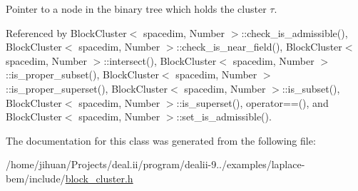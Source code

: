 Pointer to a node in the binary tree which holds the cluster $\tau$. 

Referenced by Block\+Cluster$<$ spacedim, Number $>$\+::check\+\_\+is\+\_\+admissible(), Block\+Cluster$<$ spacedim, Number $>$\+::check\+\_\+is\+\_\+near\+\_\+field(), Block\+Cluster$<$ spacedim, Number $>$\+::intersect(), Block\+Cluster$<$ spacedim, Number $>$\+::is\+\_\+proper\+\_\+subset(), Block\+Cluster$<$ spacedim, Number $>$\+::is\+\_\+proper\+\_\+superset(), Block\+Cluster$<$ spacedim, Number $>$\+::is\+\_\+subset(), Block\+Cluster$<$ spacedim, Number $>$\+::is\+\_\+superset(), operator==(), and Block\+Cluster$<$ spacedim, Number $>$\+::set\+\_\+is\+\_\+admissible().



The documentation for this class was generated from the following file\+:\begin{DoxyCompactItemize}
\item 
/home/jihuan/\+Projects/deal.\+ii/program/dealii-\/9../examples/laplace-\/bem/include/\hyperlink{block__cluster_8h}{block\+\_\+cluster.\+h}\end{DoxyCompactItemize}
